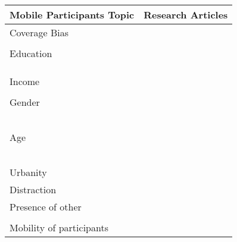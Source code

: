 \begin{table}
	\centering
	\begin{tabular}{ll}
		\toprule
		Mobile Participants Topic  &  Research Articles \\
		\midrule
        Coverage Bias & \cite{keusch_coverage_2020, bucher_exploring_2021}\\
        & \cite{fuchs_the_2009}\\
         Education & \cite{de_comparing_2013, gummer_does_2019}\\
        & \cite{de_mobile_2014, zou_mobile_2021}\\
        & \cite{skeie_smartphone_2019, keusch_web_2017}\\
        & \cite{toepoel_what_2014}\\
         Income & \cite{zou_mobile_2021, skeie_smartphone_2019}\\
        & \cite{toepoel_what_2014}\\
         Gender & \cite{de_comparing_2013, wells_comparison_2014}\\
        & \cite{ liebe_does_2015, lambert_living_2015}\\
        & \cite{bosch_measurement_2019, schlosser_mobile_2018}\\
        & \cite{de_mobile_2014, zou_mobile_2021}\\
        & \cite{brosnan_pc,_2017, skeie_smartphone_2019}\\
        & \cite{keusch_web_2017, toepoel_what_2014}\\
         Age & \cite{de_comparing_2013, wells_comparison_2014}\\
        & \cite{gummer_does_2019, liebe_does_2015}\\
        & \cite{bosch_measurement_2019, de_mobile_2014}\\
        & \cite{zou_mobile_2021, brosnan_pc,_2017}\\
        & \cite{skeie_smartphone_2019, bosch_using_2021}\\
        & \cite{keusch_web_2017, toepoel_what_2014}\\
         Urbanity & \cite{de_mobile_2014, toepoel_what_2014}\\
         Distraction & \cite{antoun_effects_2017, toninelli_smartphones_2016}\\
         Presence of other & \cite{antoun_effects_2017, mavletova_sensitive_2013}\\
        & \cite{toninelli_smartphones_2016}\\
         Mobility of participants & \cite{de_comparing_2013, mavletova_data_2013}\\

\end{tabular}
\end{table}
